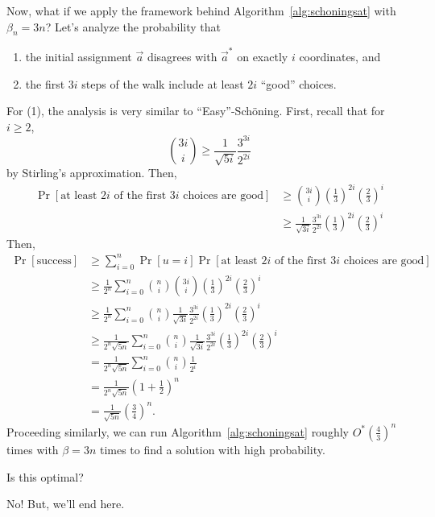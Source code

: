         Now, what if we apply the framework behind Algorithm~\ref{alg:schoningsat} with \(\beta_n=3n\)? Let's analyze the probability that 
        \begin{enumerate}
            \item the initial assignment \(\vec{a}\) disagrees with \(\vec{a}^*\) on exactly \(i\) coordinates, and
            \item the first \(3i\) steps of the walk include at least \(2i\) ``good'' choices.
        \end{enumerate}
        For (1), the analysis is very similar to ``Easy''-Sch\"oning. First, recall that for \(i\geq 2\),
        \begin{equation*}
            \binom{3i}{i}\geq \frac{1}{\sqrt{5i}}\frac{3^{3i}}{2^{2i}}
        \end{equation*}
        by Stirling's approximation. Then,
        \begin{align*}
            \Pr[\text{at least }2i\text{ of the first }3i\text{ choices are good}]&\geq\binom{3i}{i}\left(\frac{1}{3}\right)^{2i}\left(\frac{2}{3}\right)^i \\
            &\geq \frac{1}{\sqrt{3i}}\frac{3^{3i}}{2^{2i}}  \left(\frac{1}{3}\right)^{2i}\left(\frac{2}{3}\right)^i
        \end{align*}
        Then,
        \begin{align*}
            \Pr[\text{success}]&\geq \sum_{i=0}^n\Pr[u=i]\Pr[\text{at least }2i\text{ of the first }3i\text{ choices are good}] \\
            &\geq \frac{1}{2^n}\sum_{i=0}^n \binom{n}{i}\binom{3i}{i}  \left(\frac{1}{3}\right)^{2i}\left(\frac{2}{3}\right)^i \\
            &\geq \frac{1}{2^n}\sum_{i=0}^n \binom{n}{i}\frac{1}{\sqrt{3i}}\frac{3^{3i}}{2^{2i}}  \left(\frac{1}{3}\right)^{2i}\left(\frac{2}{3}\right)^i \\
            &\geq \frac{1}{2^n\sqrt{5n}}\sum_{i=0}^n\binom{n}{i}\frac{1}{\sqrt{3i}}\frac{3^{3i}}{2^{2i}}  \left(\frac{1}{3}\right)^{2i}\left(\frac{2}{3}\right)^i \\
            &=\frac{1}{2^n\sqrt{5n}}\sum_{i=0}^n\binom{n}{i}\frac{1}{2^i} \\
            &=\frac{1}{2^n\sqrt{5n}}\left(1+\frac{1}{2}\right)^n \\
            &=\frac{1}{\sqrt{5n}}\left(\frac{3}{4}\right)^n.
        \end{align*}
        Proceeding similarly, we can run Algorithm~\ref{alg:schoningsat} roughly \(O^*\left(\frac{4}{3}\right)^n\) times with \(\beta=3n\) times to find a solution with high probability.
        \begin{question*}
            Is this optimal?
        \end{question*}
        \begin{answer*}
            No! But, we'll end here.
        \end{answer*}

